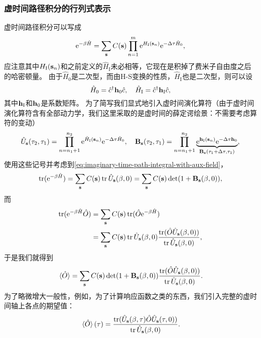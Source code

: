 \documentclass[hyperref, UTF8, a4paper]{ctexart}
\newcommand*{\ee}{\mathrm{e}}
\begin{document}
\subsubsection{虚时间路径积分的行列式表示}

虚时间路径积分可以写成
\begin{equation}
    \ee^{-\beta \hat{H}} = \sum_{\vb{s}} C(\vb{s}) \prod_{n=1}^m \ee^{H_\text{I}(\vb{s}_n)} \ee^{-\Delta \tau \hat{H}_0}, 
    \label{eq:imaginary-time-path-integral-with-aux-field}
\end{equation}
应注意其中$H_\text{I}(\vb{s}_n)$和之前定义的$\hat{H}_\text{I}$未必相等，它现在是积掉了费米子自由度之后的哈密顿量。
由于$\hat{H}_0$是二次型，而由H-S变换的性质，$\hat{H}_\text{I}$也是二次型，则可以设
\begin{equation}
    \hat{H}_0 = \hat{c}^\dagger \vb{h}_0 \hat{c}, \quad \hat{H}_\text{I} = \hat{c}^\dagger \vb{h}_\text{I} \hat{c},
\end{equation}
其中$\vb{h}_\text{I}$和$\vb{h}_0$是系数矩阵。
为了简写我们显式地引入虚时间演化算符（由于虚时间演化算符含有全部动力学，我们这里采取的是虚时间的薛定谔绘景：不需要考虑算符的变动）
\begin{equation}
    \hat{U}_{\vb{s}}(\tau_2, \tau_1) = \prod_{n=n_1+1}^{n_2} \ee^{ \hat{H}_\text{I}(\vb{s}_n)} \ee^{-\Delta \tau \hat{H}_0}, \quad \vb{B}_{\vb{s}}(\tau_2, \tau_1) = \prod_{n=n_1+1}^{n_2} \underbrace{\ee^{\vb{h}_\text{I}(\vb{s}_n)} \ee^{-\Delta \tau \vb{h}_0}}_{\vb{B}_{\vb{s}}(\tau_1+\Delta \tau, \tau_1)},
\end{equation}
使用这些记号并考虑到\eqref{eq:imaginary-time-path-integral-with-aux-field}，
\[
    \trace(\ee^{-\beta \hat{H}}) = \sum_{\vb{s}} C(\vb{s}) \trace \hat{U}_{\vb{s}}(\beta, 0) = \sum_{\vb{s}} C(\vb{s}) \det(1 + \vb{B}_{\vb{s}}(\beta, 0)),
\]
而
\[
    \begin{aligned}
        \trace(\ee^{-\beta \hat{H}} \hat{O}) &= \sum_{\vb{s}} C(\vb{s}) \trace(\hat{O} \ee^{-\beta \hat{H}}) \\
        &= \sum_{\vb{s}} C(\vb{s}) \trace\hat{U}_{\vb{s}}(\beta, 0) \frac{\trace(\hat{O} \hat{U}_{\vb{s}}(\beta, 0))}{\trace \hat{U}_{\vb{s}}(\beta, 0)},
    \end{aligned} 
\]
于是我们就得到
\begin{equation}
    \expval*{\hat{O}} = \sum_{\vb{s}} C(\vb{s}) \det(1 + \vb{B}_{\vb{s}}(\beta, 0)) \frac{\trace(\hat{O} \hat{U}_{\vb{s}}(\beta, 0))}{\trace \hat{U}_{\vb{s}}(\beta, 0)}.
\end{equation}
为了略微增大一般性，例如，为了计算响应函数之类的东西，我们引入完整的虚时间轴上各点的期望值：
\begin{equation}
    \expval*{\hat{O}}(\tau) = \frac{\trace(\hat{U}_{\vb{s}}(\beta, \tau) \hat{O} \hat{U}_{\vb{s}}(\tau, 0))}{\trace \hat{U}_{\vb{s}}(\beta, 0)}.
\end{equation}
\end{document}

